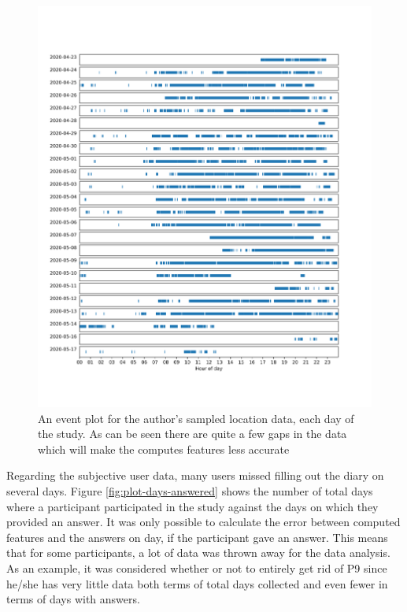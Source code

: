 \begin{figure}[h]
    \centering
    \includegraphics[width=\textwidth]{images/study/thomas-gaps.png}
    \caption{An event plot for the author's sampled location data, each day of the study. As can be seen there are quite a few gaps in the data which will make the computes features less accurate}
    \label{fig:plot-gaps-data}
\end{figure}

Regarding the subjective user data, many users missed filling out the diary on several days. Figure \ref{fig:plot-days-answered} shows the number of total days where a participant participated in the study against the days on which they provided an answer. It was only possible to calculate the error between computed features and the answers on day, if the participant gave an answer. This means that for some participants, a lot of data was thrown away for the data analysis. As an example, it was considered whether or not to entirely get rid of P9 since he/she has very little data both terms of total days collected and even fewer in terms of days with answers. \\


